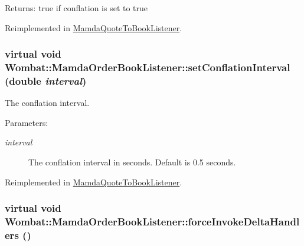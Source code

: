 \begin{Desc}
\item[Returns:]true if conflation is set to true \end{Desc}


Reimplemented in \hyperlink{classMamdaQuoteToBookListener_424049fa1fff7fe0a6e7da84ea9b2da6}{Mamda\-Quote\-To\-Book\-Listener}.\hypertarget{classWombat_1_1MamdaOrderBookListener_408fe065eeefd1322fb3c2f78751e806}{
\subsubsection[setConflationInterval]{\setlength{\rightskip}{0pt plus 5cm}virtual void Wombat::Mamda\-Order\-Book\-Listener::set\-Conflation\-Interval (double {\em interval})}}
\label{classWombat_1_1MamdaOrderBookListener_408fe065eeefd1322fb3c2f78751e806}


The conflation interval. 

\begin{Desc}
\item[Parameters:]
\begin{description}
\item[{\em interval}]The conflation interval in seconds. Default is 0.5 seconds. \end{description}
\end{Desc}


Reimplemented in \hyperlink{classMamdaQuoteToBookListener_f821050ad069bc72b07f419c441e85cc}{Mamda\-Quote\-To\-Book\-Listener}.\hypertarget{classWombat_1_1MamdaOrderBookListener_c3349c645be9a131ab64fc81ed203730}{
\subsubsection[forceInvokeDeltaHandlers]{\setlength{\rightskip}{0pt plus 5cm}virtual void Wombat::Mamda\-Order\-Book\-Listener::force\-Invoke\-Delta\-Handlers ()}}
\label{classWombat_1_1MamdaOrderBookListener_c3349c645be9a131ab64fc81ed203730}


